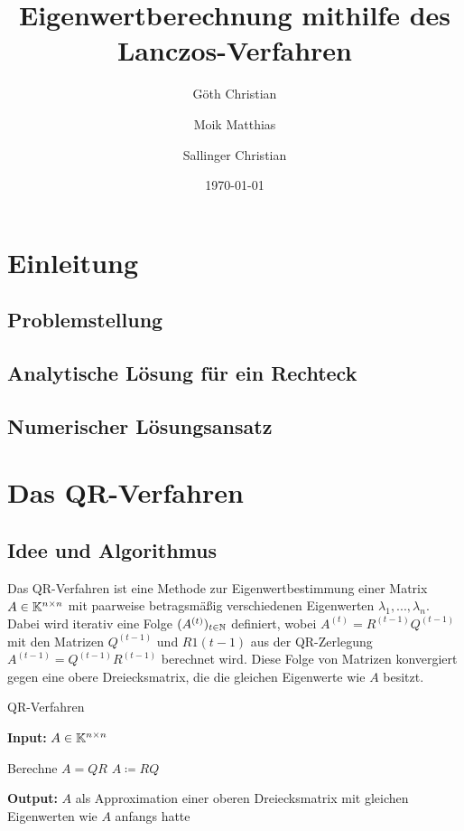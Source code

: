 \documentclass{article}
\begin{document}
\title
{
	Eigenwertberechnung mithilfe des Lanczos-Verfahren
}
\author
{
	Göth Christian
	\and
	Moik Matthias
	\and
	Sallinger Christian
}
\date{\today}
\maketitle

\newpage
\tableofcontents
\newpage


\section{Einleitung}

\subsection{Problemstellung}
\subsection{Analytische Lösung für ein Rechteck}
\subsection{Numerischer Lösungsansatz}

\section{Das QR-Verfahren}

\subsection{Idee und Algorithmus}

Das QR-Verfahren ist eine Methode zur Eigenwertbestimmung einer Matrix $A \in \mathbb{K}^{n \times n}$ mit paarweise betragsmäßig verschiedenen Eigenwerten $\lambda_1, ..., \lambda_n$. Dabei wird iterativ eine Folge $(A^{(t)})_{t \in \mathbb{N}}$ definiert, wobei $A^{(t)} = R^{(t-1)}Q^{(t-1)}$ mit den Matrizen $Q^{(t-1)}$ und $R1{(t-1)}$ aus der QR-Zerlegung $A^{(t-1)} = Q^{(t-1)}R^{(t-1)}$ berechnet wird. Diese Folge von Matrizen konvergiert gegen eine obere Dreiecksmatrix, die die gleichen Eigenwerte wie $A$ besitzt.

\renewcommand{\algorithmicrequire}{\textbf{Input:}}
\renewcommand{\algorithmicensure}{\textbf{Output:}}

\begin{algorithm}
	\label{QR-Verfahren}
	\caption{QR-Verfahren}
	\algorithmicrequire{ $A \in \mathbb{K}^{n\times n}$}
	\begin{algorithmic}[1]
		\State Berechne $A = QR$
		\State $A \coloneqq RQ$
		\EndWhile
	\end{algorithmic}
	\algorithmicensure{ $A$ als Approximation einer oberen Dreiecksmatrix mit gleichen Eigenwerten wie $A$ anfangs hatte}
\end{algorithm}
\end{document}
